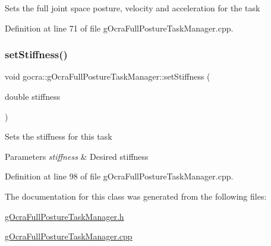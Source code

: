 Sets the full joint space posture, velocity and acceleration for the task 

Definition at line 71 of file g\+Ocra\+Full\+Posture\+Task\+Manager.\+cpp.

\hypertarget{classgocra_1_1gOcraFullPostureTaskManager_a30df8f38f4084c0404337f168ad741dc}{}\label{classgocra_1_1gOcraFullPostureTaskManager_a30df8f38f4084c0404337f168ad741dc} 
\subsubsection{\texorpdfstring{set\+Stiffness()}{setStiffness()}}
{\footnotesize\ttfamily void gocra\+::g\+Ocra\+Full\+Posture\+Task\+Manager\+::set\+Stiffness (\begin{DoxyParamCaption}\item[{double}]{stiffness }\end{DoxyParamCaption})}

Sets the stiffness for this task


\begin{DoxyParams}{Parameters}
{\em stiffness} & Desired stiffness \\
\hline
\end{DoxyParams}


Definition at line 98 of file g\+Ocra\+Full\+Posture\+Task\+Manager.\+cpp.



The documentation for this class was generated from the following files\+:\begin{DoxyCompactItemize}
\item 
\hyperlink{gOcraFullPostureTaskManager_8h}{g\+Ocra\+Full\+Posture\+Task\+Manager.\+h}\item 
\hyperlink{gOcraFullPostureTaskManager_8cpp}{g\+Ocra\+Full\+Posture\+Task\+Manager.\+cpp}\end{DoxyCompactItemize}
